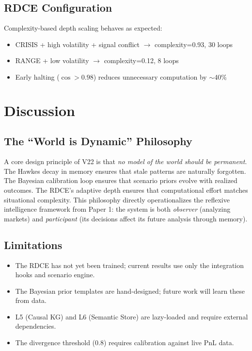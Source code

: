 \documentclass[11pt, a4paper]{article}
\begin{document}
\subsection{RDCE Configuration}

Complexity-based depth scaling behaves as expected:
\begin{itemize}
  \item CRISIS + high volatility + signal conflict $\rightarrow$ complexity=0.93, 30 loops
  \item RANGE + low volatility $\rightarrow$ complexity=0.12, 8 loops
  \item Early halting ($\cos > 0.98$) reduces unnecessary computation by $\sim$40\%
\end{itemize}


\section{Discussion}
\label{sec:discussion}

\subsection{The ``World is Dynamic'' Philosophy}

A core design principle of V22 is that \emph{no model of the world should be permanent}. The Hawkes decay in memory ensures that stale patterns are naturally forgotten. The Bayesian calibration loop ensures that scenario priors evolve with realized outcomes. The RDCE's adaptive depth ensures that computational effort matches situational complexity. This philosophy directly operationalizes the reflexive intelligence framework from Paper 1: the system is both \emph{observer} (analyzing markets) and \emph{participant} (its decisions affect its future analysis through memory).

\subsection{Limitations}

\begin{itemize}
  \item The RDCE has not yet been trained; current results use only the integration hooks and scenario engine.
  \item The Bayesian prior templates are hand-designed; future work will learn these from data.
  \item L5 (Causal KG) and L6 (Semantic Store) are lazy-loaded and require external dependencies.
  \item The divergence threshold (0.8) requires calibration against live PnL data.
\end{itemize}
\end{document}
